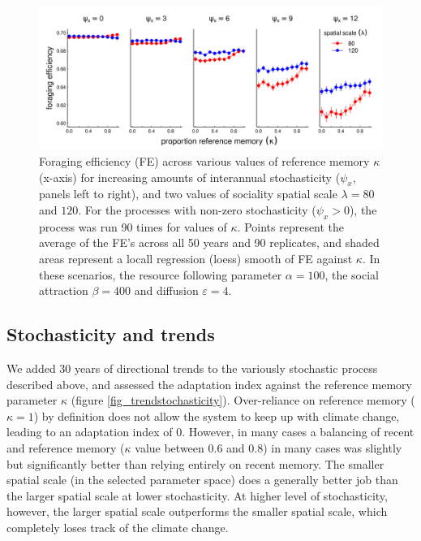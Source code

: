 \documentclass[utf8]{frontiersSCNS} %
\begin{document}
	\begin{figure}
		\includegraphics[width=\textwidth]{figures/stochasticity.png}
		
		\caption{\label{fig_stochasticity} Foraging efficiency (FE) across various values of reference memory $\kappa$ (x-axis) for increasing amounts of interannual stochasticity ($\psi_x$, panels left to right), and two values of sociality spatial scale $\lambda = 80$ and $120$. For the processes with non-zero stochasticity ($\psi_x > 0$), the process was run 90 times for values of $\kappa$. Points represent the average of the FE's across all 50 years and 90 replicates, and shaded areas represent a locall regression (loess) smooth of FE against $\kappa$. In these scenarios, the resource following parameter $\alpha = 100$, the social attraction $\beta = 400$ and diffusion $\varepsilon = 4$.} 
		
	\end{figure}
	
\subsection{Stochasticity and trends}
	
	We added 30 years of directional trends to the variously stochastic process described above, and assessed the adaptation index against the reference memory parameter $\kappa$ (figure \ref{fig_trendstochasticity}). Over-reliance on reference memory ($\kappa = 1$) by definition does not allow the system to keep up with climate change, leading to an adaptation index of 0. However, in many cases a balancing of recent and reference memory ($\kappa$ value between 0.6 and 0.8) in many cases was slightly but significantly better than relying entirely on recent memory. The smaller spatial scale (in the selected parameter space) does a generally better job than the larger spatial scale at lower stochasticity. At higher level of stochasticity, however, the larger spatial scale outperforms the smaller spatial scale, which completely loses track of the climate change.
	
\end{document}

